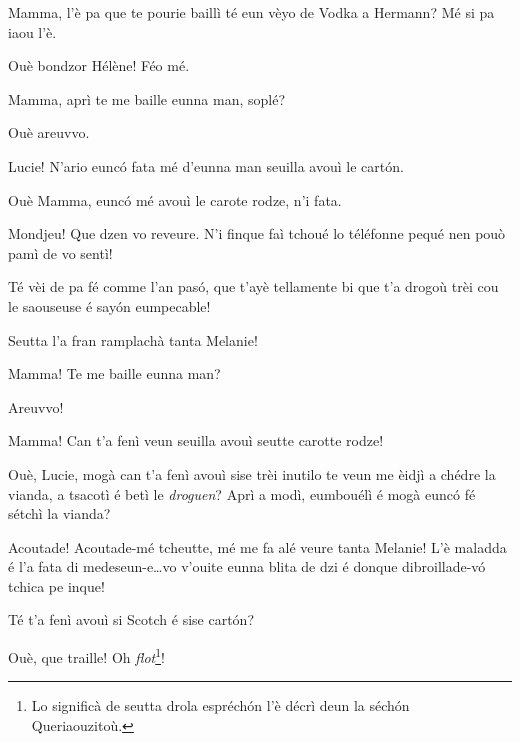 \begin{drama}
\Helenespeaks{}  Mamma, l'è pa que te pourie baillì té eun vèyo de Vodka a Hermann? Mé si pa iaou l'è.

\Luciespeaks Ouè bondzor Hélène! Féo mé. 


\Remyspeaks  {} Mamma, aprì te me baille eunna man, soplé?

\Luciespeaks Ouè areuvvo.

\Cesarspeaks Lucie! N'ario eunc\'o fata mé d'eunna man seuilla avouì le cart\'on.

\Helenespeaks  Ouè Mamma, eunc\'o mé avouì le carote rodze, n'i fata.

\Luciespeaks Mondjeu! Que dzen vo reveure. N’i finque faì tchoué lo téléfonne pequé nen pouò pamì de vo sentì!


\Luciespeaks{} Té vèi de pa fé comme l'an pas\'o, que t'ayè tellamente bi que t'a drogoù trèi cou le saouseuse é say\'on eumpecable!

\Hermannspeaks{} Seutta l’a fran ramplachà tanta Melanie!

\Remyspeaks{} Mamma! Te me baille eunna man?

\Luciespeaks Areuvvo!

\Helenespeaks  Mamma! Can t'a fenì veun seuilla avouì seutte carotte rodze!

\Hermannspeaks{} Ouè, Lucie,  mogà can t’a fenì avouì sise trèi inutilo te veun me èidjì a chédre la vianda, a tsacotì é betì le \textit{droguen}? Aprì a modì, eumbouélì é mogà eunc\'o fé sétchì la vianda?

\Luciespeaks{} Acoutade! Acoutade-mé tcheutte, mé me fa alé veure tanta Melanie! L'è maladda é l'a fata di medeseun-e\ldots vo v'ouite eunna blita de dzi é donque  dibroillade-v\'o tchica pe inque!


\scene[-- Se comenche!]

\Hermannspeaks{} Té t'a fenì avouì si Scotch é sise cart\'on?

\Cesarspeaks Ouè, que traille! Oh \textit{flot}\footnote{ Lo significà de seutta drola espréch\'on l'è décrì deun la séch\'on Queriaouzitoù.}!


\end{drama}

